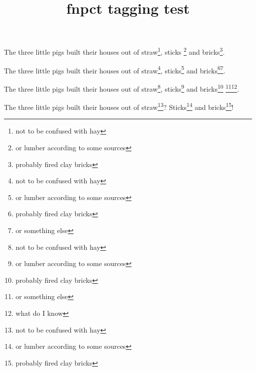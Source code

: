 \documentclass{article}
\title{fnpct tagging test}
\begin{document}
The three little pigs built their houses out of straw\footnote*{not to be
confused with hay}, sticks  \footnote{or lumber according to some sources}
and bricks\footnote{probably fired clay bricks}.

The three little pigs built their houses out of straw\footnote{not to be
confused with hay}, sticks\footnote{or lumber according to some sources}
and bricks\footnote{probably fired clay bricks}\footnote{or something else}.

The three little pigs built their houses out of
straw\footnote{not to be confused with hay},
sticks\footnote{or lumber according to some sources}
and bricks\footnote{probably fired clay bricks}%
\footnote{or something else}\footnote{what do I know}.

The three little pigs built their houses out of straw\footnote{not to be
confused with hay}? Sticks\footnote{or lumber according to some sources}
and bricks\footnote{probably fired clay bricks}!
\end{document}
